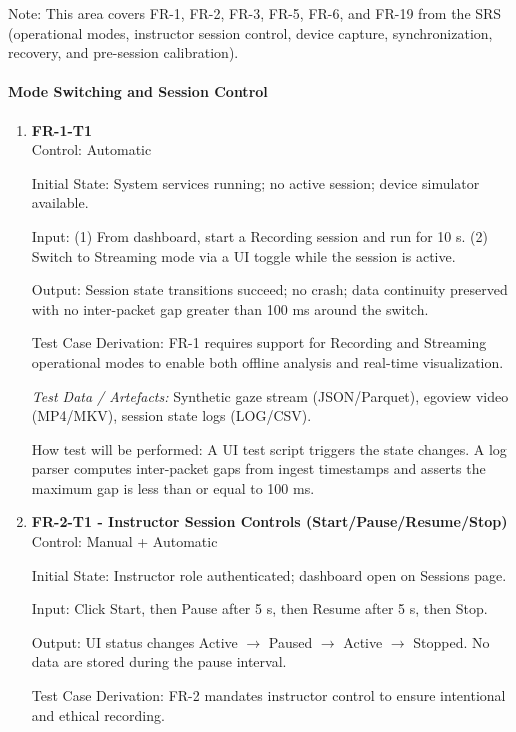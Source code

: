 \documentclass[12pt, titlepage]{article}
\begin{document}
Note: This area covers FR-1, FR-2, FR-3, FR-5, FR-6, and FR-19 from the SRS (operational modes, instructor session control, device capture, synchronization, recovery, and pre-session calibration).

\paragraph{Mode Switching and Session Control}

\begin{enumerate}

\item \textbf{FR-1-T1} \\

Control: Automatic

Initial State: System services running; no active session; device simulator available.

Input: (1) From dashboard, start a Recording session and run for 10 s. (2) Switch to Streaming mode via a UI toggle while the session is active.

Output: Session state transitions succeed; no crash; data continuity preserved with no inter-packet gap greater than 100 ms around the switch.

Test Case Derivation: FR-1 requires support for Recording and Streaming operational modes to enable both offline analysis and real-time visualization.

\textit{Test Data / Artefacts:} Synthetic gaze stream (JSON/Parquet), egoview video (MP4/MKV), session state logs (LOG/CSV).

How test will be performed: A UI test script triggers the state changes. A log parser computes inter-packet gaps from ingest timestamps and asserts the maximum gap is less than or equal to 100 ms.

\item \textbf{FR-2-T1 - Instructor Session Controls (Start/Pause/Resume/Stop)} \\

Control: Manual + Automatic

Initial State: Instructor role authenticated; dashboard open on Sessions page.

Input: Click Start, then Pause after 5 s, then Resume after 5 s, then Stop.

Output: UI status changes Active $\rightarrow$ Paused $\rightarrow$ Active $\rightarrow$ Stopped. No data are stored during the pause interval.

Test Case Derivation: FR-2 mandates instructor control to ensure intentional and ethical recording.


\end{enumerate}
\end{document}
